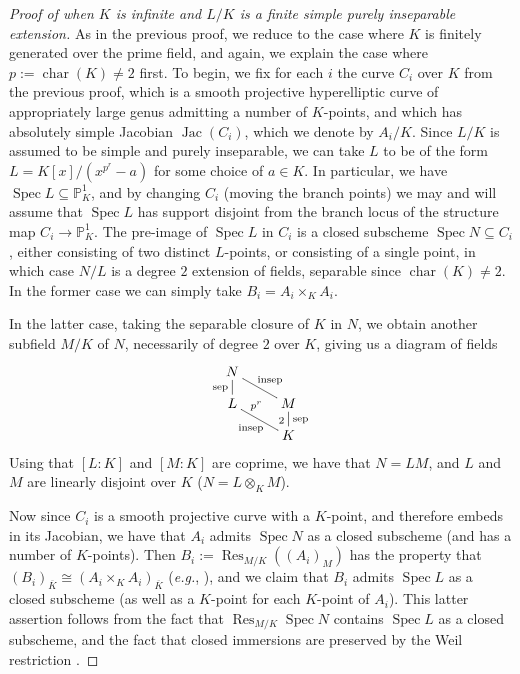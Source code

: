 \documentclass[11pt, reqno]{amsart}
\numberwithin{equation}{section}
\theoremstyle{definition}
\theoremstyle{remark}
\renewcommand{\bar}[1]{{\overline{#1}}}
\begin{document}
\begin{proof}[Proof of  when $K$ is infinite and $L/K$ is a finite simple \emph{purely inseparable} extension]  As in the previous proof, we reduce to the case where $K$ is finitely generated over the prime field, and again, we explain the case where $p := \operatorname{char}(K)\ne 2$ first.
To begin, we fix for each $i$ the curve $C_i$ over $K$ from the previous proof, which is a smooth projective hyperelliptic curve of appropriately large genus admitting a number of $K$-points, and which has absolutely simple Jacobian $\operatorname{Jac}(C_i)$, which we denote by $A_i/K$.  
 Since $L/K$ is assumed to be simple and purely inseparable, we can take $L$ to be  of the form $L=K[x]/(x^{p^r}-a)$ for some choice of $a\in K$.  In particular, we have $\operatorname{Spec}L\subseteq \mathbb P^1_K$, and by changing $C_i$ (moving the branch points) we may and will assume that $\operatorname{Spec}L$ has support disjoint from the branch locus of the structure map $C_i\to \mathbb P^1_K$.  The pre-image of $\operatorname{Spec}L$ in $C_i$ is a closed subscheme $\operatorname{Spec}N\subseteq C_i$, either consisting of two distinct $L$-points, or   consisting of a single point, in which case  $N/L$ is a degree $2$ extension of fields, separable since  $\operatorname{char}(K)\ne 2$.  
In the former case we can simply take $B_i=A_i\times_KA_i$.  

In the latter case,  
 taking the separable closure of $K$ in $N$, we obtain another subfield $M/K$ of $N$, necessarily of degree $2$ over $K$, giving us a diagram of fields
 \begin{equation*}\label{E:tower0}
 \xymatrix@R=1em{
   N \ar@{-}[d]_{\text{sep}} \ar@{-}[dr]^{\text{insep}} \\
   L\ar@{-}[dr]_{\text{insep}}^<>(0.25){p^r}   & M \ar@{-}[d]^{\text{sep}}_2\\
   &K
  }
\end{equation*}
Using that $[L:K]$ and $[M:K]$ are coprime, we have that $N=LM$, and   $L$ and $M$ are linearly disjoint over $K$ ($N=L\otimes_KM$).
 
Now since $C_i$ is a smooth projective curve with a $K$-point, and therefore embeds in its Jacobian,  we have that $A_i$ admits $\operatorname{Spec}N$ as a closed subscheme (and has a number of $K$-points).   Then $B_i:=\operatorname{Res}_{M/K}((A_i)_M)$ has the property that $(B_i)_{\bar K}\cong (A_i\times_KA_i)_{\bar K}$ (\emph{e.g.}, \cite[Lem.~5]{flynntesta15}), 
  and we claim that $B_i$ admits $\operatorname{Spec}L$ as a closed subscheme (as well as a $K$-point for each  $K$-point of $A_i$). This latter assertion follows from the fact that $\operatorname{Res}_{M/K}\operatorname{Spec}N$ contains $\operatorname{Spec}L$ as a closed subscheme, and the fact that closed immersions are preserved by the Weil restriction \cite[\S 7.6, Prop.~2, p.192]{BLR}.



\end{proof}
\end{document}
